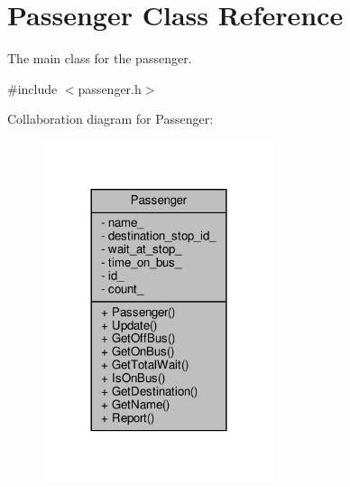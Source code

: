 \hypertarget{classPassenger}{}\section{Passenger Class Reference}
\label{classPassenger}


The main class for the passenger.  




{\ttfamily \#include $<$passenger.\+h$>$}



Collaboration diagram for Passenger\+:\nopagebreak
\begin{figure}[H]
\begin{center}
\leavevmode
\includegraphics[width=192pt]{classPassenger__coll__graph}
\end{center}
\end{figure}
